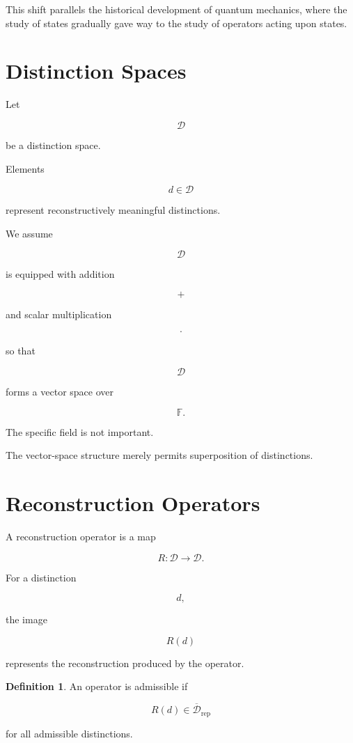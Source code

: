 \documentclass[12pt,oneside]{book}
\theoremstyle{plain} \newtheorem{theorem}{Theorem}[chapter] \newtheorem{lemma}[theorem]{Lemma} \newtheorem{proposition}[theorem]{Proposition} \newtheorem{corollary}[theorem]{Corollary}
\theoremstyle{definition} \newtheorem{definition}[theorem]{Definition} \newtheorem{axiom}[theorem]{Axiom} \newtheorem{construction}[theorem]{Construction}
\theoremstyle{remark} \newtheorem{remark}[theorem]{Remark} \newtheorem{example}[theorem]{Example}
\begin{document}
This shift parallels the historical development of quantum mechanics, where the study of states gradually gave way to the study of operators acting upon states.

\section{Distinction Spaces}

Let

\[
\mathcal D
\]

be a distinction space.

Elements

\[
d\in\mathcal D
\]

represent reconstructively meaningful distinctions.

We assume

\[
\mathcal D
\]

is equipped with addition

\[
+
\]

and scalar multiplication

\[
\cdot
\]

so that

\[
\mathcal D
\]

forms a vector space over

\[
\mathbb F.
\]

The specific field is not important.

The vector-space structure merely permits superposition of distinctions.

\section{Reconstruction Operators}

A reconstruction operator is a map

\[
R
:
\mathcal D
\rightarrow
\mathcal D.
\]

For a distinction

\[
d,
\]

the image

\[
R(d)
\]

represents the reconstruction produced by the operator.

\begin{definition}

An operator is admissible if

\[
R(d)
\in
\overline{\mathcal D}_{\mathrm{rep}}
\]

for all admissible distinctions.

\end{definition}
\end{document}
